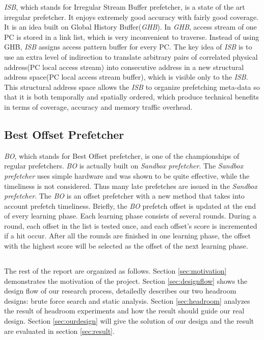   \emph{ISB}, which stands for Irregular Stream Buffer prefetcher, is a state of the art irregular prefetcher. It enjoys extremely good accuracy with fairly good coverage. It is an idea built on Global History Buffer(\emph{GHB})\cite{ghbpaper}.
In \emph{GHB}, access stream of one PC is stored in a link list, which is very inconvenient to traverse. Instead of using GHB, \emph{ISB} assigns access pattern buffer for every PC.
The key idea of \emph{ISB} is to use an extra level of indirection to translate arbitrary pairs of correlated physical address(PC local access stream) into consecutive address in a new structural address space(PC local access stream buffer), which is visible only to the \emph{ISB}.
This structural address space allows the \emph{ISB} to organize prefetching meta-data so that it is both temporally and spatially ordered, which produce technical benefits in terms of coverage, accuracy and memory traffic overhead.

  \subsection{Best Offset Prefetcher}
  \label{sec:bointro}

  \emph{BO}, which stands for Best Offset prefetcher, is one of the championships of regular prefetchers. \emph{BO} is actually built on \emph{Sandbox prefetcher}\cite{sandboxpaper}.
 The \emph{Sandbox prefetcher} uses simple hardware and was shown to be quite effective, while the timeliness is not considered.
 Thus many late prefetches are issued in the \emph{Sandbox prefetcher}.
 The \emph{BO} is an offset prefetcher with a new method that takes into account prefetch timeliness. Briefly, the \emph{BO} prefetch offset is updated at the end of every learning phase. Each learning phase consists of several rounds.
 During a round, each offset in the list is tested once, and each offset's score is incremented if a hit occur.
 After all the rounds are finished in one learning phase, the offset with the highest score will be selected as the offset of the next learning phase.


 \subsection*{}
 The rest of the report are organized as follows. Section \ref{sec:motivation} demonstrates the motivation of the project. Section \ref{sec:designflow} shows the design flow of our research process, detailedly describes our two headroom designs: brute force search and static analysis. Section \ref{sec:headroom} analyzes the result of headroom experiments and how the result should guide our real design. Section \ref{sec:ourdesign} will give the solution of our design and the result are evaluated in section \ref{sec:result}.
 
 
 
